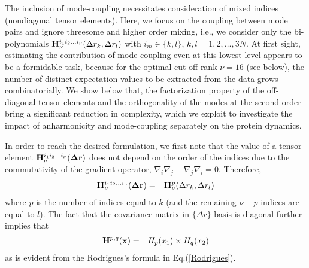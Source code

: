 \documentclass[prl,nofootinbib,twocolumn,floatfix,showpacs]{revtex4}
\begin{document}
The inclusion of mode-coupling necessitates consideration of mixed
indices (nondiagonal tensor elements). Here, we focus on the coupling
between mode pairs and ignore threesome and higher order mixing, i.e.,
we consider only the bi-polynomials ${\bf H}^{i_1i_2\dots
  i_\nu}_\nu(\Delta r_k,\Delta r_l)$ with $i_m \in \{k,l\}$,
$k,l=1,2,\dots,3N$. At first sight, estimating the contribution of
mode-coupling even at this lowest level appears to be a formidable
task, because for the optimal cut-off rank $\nu=16$ (see below), the
number of distinct expectation values to be extracted from the data
grows combinatorially. We show below that, the factorization property
of the off-diagonal tensor elements and the orthogonality of the modes
at the second order bring a significant reduction in complexity, which
we exploit to investigate the impact of anharmonicity and
mode-coupling separately on the protein dynamics.

In order to reach the desired formulation, we first note that the value
of a tensor element ${\bf H}^{i_1i_2\dots i_\nu}_\nu({\bf \Delta r})$
does not depend on the order of the indices due to the commutativity
of the gradient operator, $\nabla_i\nabla_j -
\nabla_j\nabla_i=0$. Therefore,
\begin{eqnarray}
{\bf H}^{i_1i_2\dots i_\nu}_\nu({\bf \Delta r}) &=& {\bf H}^p_\nu(\Delta r_k,\Delta r_l) \nonumber \\
\end{eqnarray}
where $p$ is the number of indices equal to $k$ (and the remaining
$\nu-p$ indices are equal to $l$). The fact that the covariance matrix
in $\{\Delta r\}$ basis is diagonal further implies that
\begin{eqnarray}
\label{factorization}
{\bf H}^{p,q}({\bf x}) &=& H_p(x_1)\times H_q(x_2)
\end{eqnarray}
as is evident from the Rodrigues's formula in Eq.(\ref{Rodrigues}).
\end{document}
